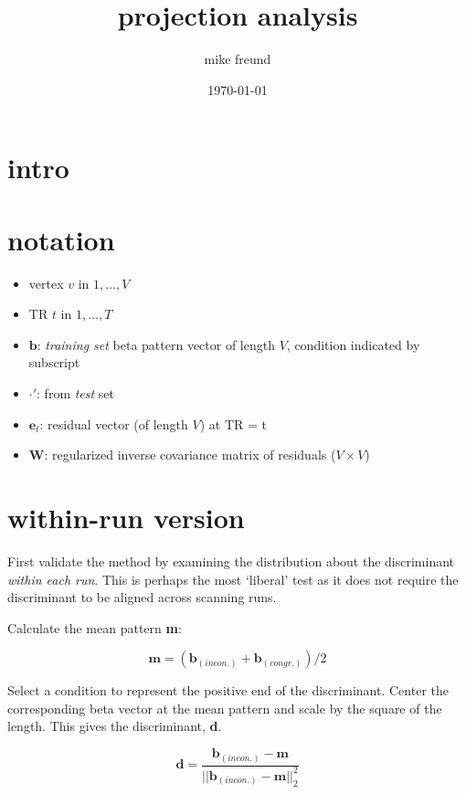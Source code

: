\documentclass{article}\usepackage[]{graphicx}\usepackage[]{color}
\begin{document}
\title{projection analysis}
\author{mike freund}
\date{\today}
\maketitle


\section*{intro}


\section*{notation}

\begin{itemize}
  \item vertex $v \text{ in } 1, \dots, V$
  \item TR $t \text{ in } 1, \dots, T$
  \item $\mathbf{b}$: \textit{training set} beta pattern vector of length $V$, condition indicated by subscript
  \item $\cdot'$: from \textit{test} set
  \item $\mathbf{e}_t$: residual vector (of length $V$) at TR = t
  \item $\mathbf{W}$: regularized inverse covariance matrix of residuals ($V \times V$)
\end{itemize}


\section*{within-run version}

First validate the method by examining the distribution about the discriminant \textit{within each run}.
This is perhaps the most `liberal' test as it does not require the discriminant to be aligned across scanning runs.

Calculate the mean pattern \textbf{m}:

\[
\mathbf{m} = ({\mathbf{b}_\mathit{(incon.)} + \mathbf{b}_\mathit{(congr.)}})/2
\]

Select a condition to represent the positive end of the discriminant.
Center the corresponding beta vector at the mean pattern and scale by the square of the length.
This gives the discriminant, \textbf{d}.

\[
\mathbf{d} = 
\frac
{\mathbf{b}_\mathit{(incon.)} - \mathbf{m}}
{||\mathbf{b}_\mathit{(incon.)} - \mathbf{m}||_2^2}
\]
\end{document}
